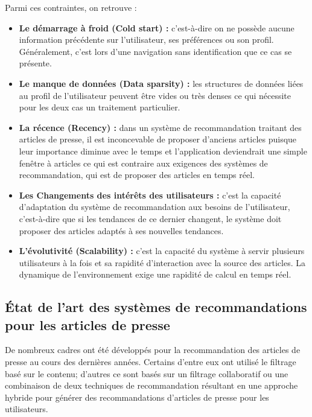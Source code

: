 Parmi ces contraintes, on retrouve :
\begin{itemize}
    
    \item \textbf{Le démarrage à froid (Cold start)\label{cold-start} : }c'est-à-dire on ne possède aucune information précédente sur l'utilisateur, ses préférences ou son profil. Généralement, c'est lors d'une navigation sans identification que ce cas se présente.\\
    
    \item \textbf{Le manque de données (Data sparsity) : }les structures de données liées au profil de l'utilisateur peuvent être vides ou très denses ce qui nécessite pour les deux cas un traitement particulier.\\
    
    \item \textbf{La récence (Recency)\label{recence} : }dans un système de recommandation traitant des articles de presse, il est inconcevable de proposer d'anciens articles puisque leur importance diminue avec le temps et l'application deviendrait une simple fenêtre à articles ce qui est contraire aux exigences des systèmes de recommandation, qui est de proposer des articles en temps réel.\\
    
    \item \textbf{Les Changements des intérêts des utilisateurs : }c'est la capacité d'adaptation du système de recommandation aux besoins de l'utilisateur, c'est-à-dire que si les tendances de ce dernier changent, le système doit proposer des articles adaptés à ses nouvelles tendances.\\
        
    \item \textbf{L'évolutivité (Scalability) : }c'est la capacité du système à servir plusieurs utilisateurs à la fois et sa rapidité d'interaction avec la source des articles. La dynamique de l'environnement exige une rapidité de calcul en temps réel.\\
\end{itemize}

\subsection{État de l'art des systèmes de recommandations pour les articles de presse}
De nombreux cadres ont été développés pour la recommandation des articles de presse au cours des dernières années. Certains d'entre eux ont utilisé le filtrage basé sur le contenu; d'autres ce sont basés sur un filtrage collaboratif ou une combinaison de deux techniques de recommandation résultant en une approche hybride pour générer des recommandations d'articles de presse pour les utilisateurs.

